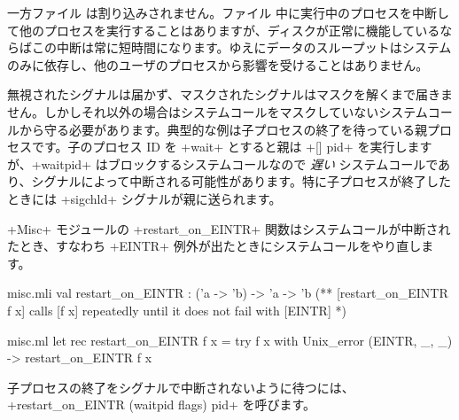 一方ファイル \io は割り込みされません。ファイル \io 中に実行中のプロセスを中断して他のプロセスを実行することはありますが、ディスクが正常に機能しているならばこの中断は常に短時間になります。ゆえにデータのスループットはシステムのみに依存し、他のユーザのプロセスから影響を受けることはありません。

無視されたシグナルは届かず、マスクされたシグナルはマスクを解くまで届きません。しかしそれ以外の場合はシステムコールをマスクしていないシステムコールから守る必要があります。典型的な例は子プロセスの終了を待っている親プロセスです。子のプロセス ID を \ml+wait+ とすると親は  \ml+[] pid+ を実行しますが、\ml+waitpid+ はブロックするシステムコールなので \emph{遅い} システムコールであり、シグナルによって中断される可能性があります。特に子プロセスが終了したときには \ml+sigchld+ シグナルが親に送られます。

\ml+Misc+ モジュールの \ml+restart_on_EINTR+ 関数はシステムコールが中断されたとき、すなわち \ml+EINTR+ 例外が出たときにシステムコールをやり直します。

%
\begin{codefile}{misc.mli}
val restart_on_EINTR : ('a -> 'b) -> 'a -> 'b
(** [restart_on_EINTR f x] calls [f x] repeatedly until it does not fail
with [EINTR] *)
\end{codefile}
%
\begin{listingcodefile}{misc.ml}
let rec restart_on_EINTR f x =
  try f x with Unix_error (EINTR, _, _) -> restart_on_EINTR f x
\end{listingcodefile}
子プロセスの終了をシグナルで中断されないように待つには、\ml+restart_on_EINTR (waitpid flags) pid+ を呼びます。

